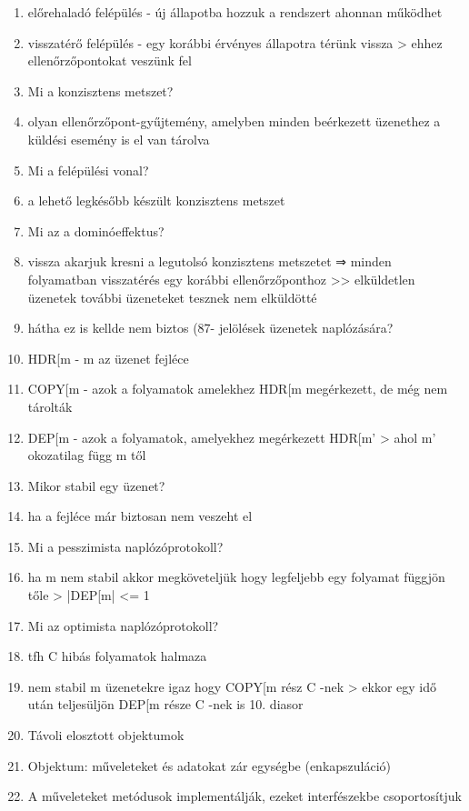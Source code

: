 \documentclass[twoside, a4paper, 12pt]{article}
\begin{document}
\begin{enumerate}
    \item előrehaladó felépülés
        - új állapotba hozzuk a rendszert ahonnan működhet
    \item visszatérő felépülés
        - egy korábbi érvényes állapotra térünk vissza
        > ehhez ellenőrzőpontokat veszünk fel
    \item  Mi a konzisztens metszet?
    \item olyan ellenőrzőpont-gyűjtemény, amelyben minden beérkezett üzenethez a küldési esemény is el van tárolva
    \item  Mi a felépülési vonal?
    \item a lehető legkésőbb készült konzisztens metszet
    \item  Mi az a dominóeffektus?
    \item vissza akarjuk kresni a legutolsó konzisztens metszetet
        ⇒ minden folyamatban visszatérés egy korábbi ellenőrzőponthoz
        >> elküldetlen üzenetek további üzeneteket tesznek nem elküldötté
    \item hátha ez is kellde nem biztos (87-
        jelölések üzenetek naplózására?
    \item HDR[m 
        - m az üzenet fejléce 
    \item COPY[m
        - azok a folyamatok amelekhez HDR[m megérkezett, de még nem tárolták
    \item DEP[m
        - azok a folyamatok, amelyekhez megérkezett HDR[m' 
        > ahol m' okozatilag függ m től
    \item  Mikor stabil egy üzenet?
    \item ha a fejléce már biztosan nem veszeht el
    \item  Mi a pesszimista naplózóprotokoll?
    \item ha m nem stabil akkor megköveteljük hogy legfeljebb egy folyamat függjön tőle
        > |DEP[m| <= 1
    \item  Mi az optimista naplózóprotokoll?
    \item tfh C hibás folyamatok halmaza
    \item nem stabil m üzenetekre igaz hogy COPY[m rész C -nek
        > ekkor egy idő után teljesüljön DEP[m része C -nek  is 
        10. diasor
    \item  Távoli elosztott objektumok
    \item Objektum: műveleteket és adatokat zár egységbe (enkapszuláció)
    \item A műveleteket metódusok implementálják, ezeket interfészekbe csoportosítjuk

\end{enumerate}
\end{document}
